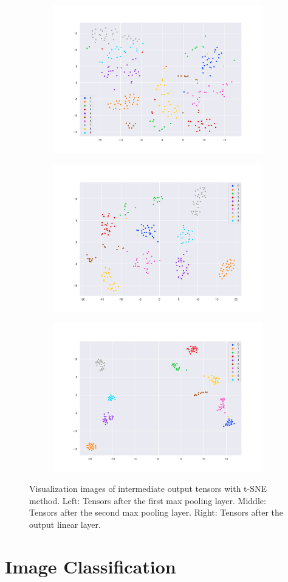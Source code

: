 \documentclass{article}
\begin{document}
\begin{figure}[htbp]
    \centering
    \begin{subfigure}
        \centering
        \includegraphics[width=0.32\linewidth]{../images/mnist_feature_map1_tsne.png}
        \label{fig:mnist_tSNE_1}
    \end{subfigure}
    \begin{subfigure}
        \centering
        \includegraphics[width=0.32\linewidth]{../images/mnist_feature_map2_tsne.png}
        \label{fig:mnist_tSNE_2}
    \end{subfigure}
    \begin{subfigure}
        \centering
        \includegraphics[width=0.32\linewidth]{../images/mnist_feature_map3_tsne.png}
        \label{fig:mnist_tSNE_3}
    \end{subfigure}
    \caption{Visualization images of intermediate output tensors with t-SNE method. Left: Tensors after the first max pooling layer. Middle: Tensors after the second max pooling layer. Right: Tensors after the output linear layer.}
    \label{fig:mnist_tsne}
\end{figure}

\section{Image Classification}
\end{document}
